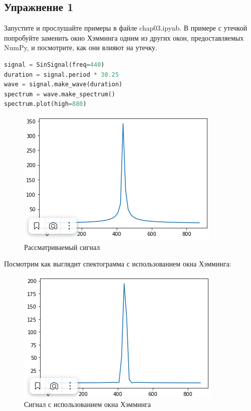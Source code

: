 \subsection{Упражнение 1}

Запустите и прослушайте примеры в файле chap03.ipynb. В примере с утечкой попробуйте заменить окно Хэмминга одним из других окон, предоставляемых NumPy, и посмотрите, как они влияют на утечку.

\begin{lstlisting}[language=Python]
signal = SinSignal(freq=440)
duration = signal.period * 30.25
wave = signal.make_wave(duration)
spectrum = wave.make_spectrum()
spectrum.plot(high=880)
\end{lstlisting}

\begin{figure}[H]
	\begin{center}
		\includegraphics[scale=1]{fig/lab03/lab3_1.png}
		\caption{Рассматриваемый сигнал}
	\end{center}
\end{figure}

Посмотрим как выглядит спектограмма с использованием окна Хэмминга:

\begin{figure}[H]
	\begin{center}
		\includegraphics[scale=1]{fig/lab03/lab3_2.png}
		\caption{Сигнал с использованием окна Хэмминга}
	\end{center}
\end{figure}

